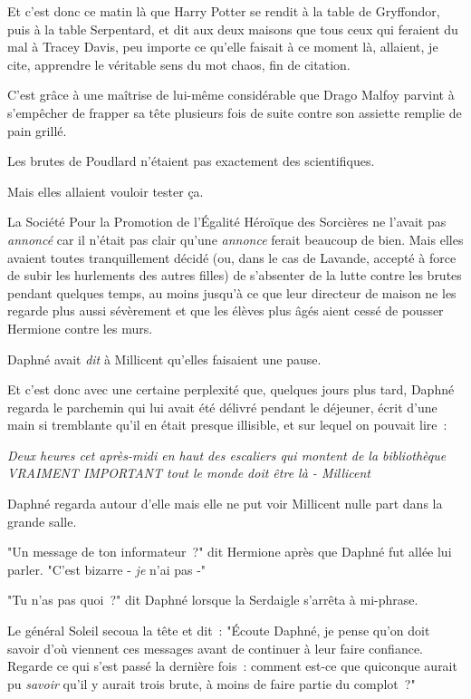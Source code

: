 \later

Et c'est donc ce matin là que Harry Potter se rendit à la table de Gryffondor, puis à la table Serpentard, et dit aux deux maisons que tous ceux qui feraient du mal à Tracey Davis, peu importe ce qu'elle faisait à ce moment là, allaient, je cite, apprendre le véritable sens du mot chaos, fin de citation.

C'est grâce à une maîtrise de lui-même considérable que Drago Malfoy parvint à s'empêcher de frapper sa tête plusieurs fois de suite contre son assiette remplie de pain grillé.

Les brutes de Poudlard n'étaient pas exactement des scientifiques.

Mais elles allaient vouloir tester ça.

\later

La Société Pour la Promotion de l'Égalité Héroïque des Sorcières ne l'avait pas \emph{annoncé} car il n'était pas clair qu'une \emph{annonce} ferait beaucoup de bien. Mais elles avaient toutes tranquillement décidé (ou, dans le cas de Lavande, accepté à force de subir les hurlements des autres filles) de s'absenter de la lutte contre les brutes pendant quelques temps, au moins jusqu'à ce que leur directeur de maison ne les regarde plus aussi sévèrement et que les élèves plus âgés aient cessé de pousser Hermione contre les murs.

Daphné avait \emph{dit} à Millicent qu'elles faisaient une pause.

Et c'est donc avec une certaine perplexité que, quelques jours plus tard, Daphné regarda le parchemin qui lui avait été délivré pendant le déjeuner, écrit d'une main si tremblante qu'il en était presque illisible, et sur lequel on pouvait lire~:

\emph{Deux heures cet après-midi en haut des escaliers qui montent de la bibliothèque VRAIMENT IMPORTANT tout le monde doit être là - Millicent}

Daphné regarda autour d'elle mais elle ne put voir Millicent nulle part dans la grande salle.

"Un message de ton informateur~?" dit Hermione après que Daphné fut allée lui parler. "C'est bizarre - \emph{je} n'ai pas -"

"Tu n'as pas quoi~?" dit Daphné lorsque la Serdaigle s'arrêta à mi-phrase.

Le général Soleil secoua la tête et dit~: "Écoute Daphné, je pense qu'on doit savoir d'où viennent ces messages avant de continuer à leur faire confiance. Regarde ce qui s'est passé la dernière fois~: comment est-ce que quiconque aurait pu \emph{savoir} qu'il y aurait trois brute, à moins de faire partie du complot~?"

